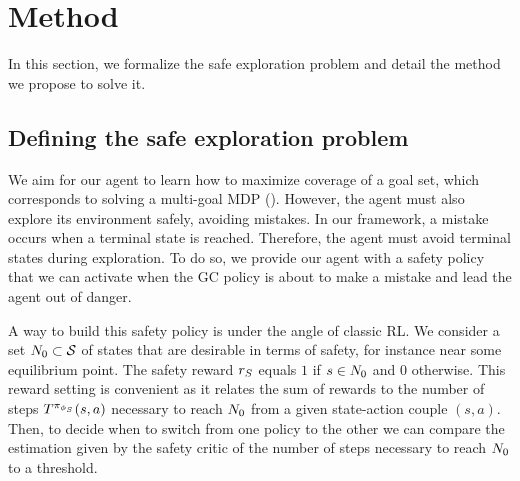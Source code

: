 \section{Method}

In this section, we formalize the safe exploration problem and detail the method we propose to solve it.

\subsection{Defining the safe exploration problem}
\label{subsection:safe_exp_problem}

We aim for our agent to learn how to maximize coverage of a goal set, which corresponds to solving a multi-goal MDP (). However, the agent must also explore its environment safely, avoiding mistakes. In our framework, a mistake occurs when a terminal state is reached. Therefore, the agent must avoid terminal states during exploration. To do so, we provide our agent with a safety policy that we can activate when the GC policy is about to make a mistake and lead the agent out of danger. 

A way to build this safety policy is under the angle of classic RL. We consider a set $N_0 \subset \mathcal{S}$ of states that are desirable in terms of safety, for instance near some equilibrium point. The safety reward $r_S$ equals $1$ if $s \in N_0$ and 0 otherwise. This reward setting is convenient as it relates the sum of rewards to the number of steps $T^{\pi_{\phi_S}}(s, a)$ necessary to reach $N_0$ from a given state-action couple $(s, a)$. Then, to decide when to switch from one policy to the other we can compare the estimation given by the safety critic of the number of steps necessary to reach $ N_0$ to a threshold.

